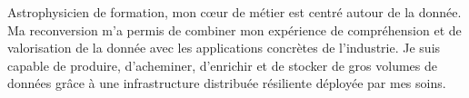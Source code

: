 

\begin{cvparagraph}

Astrophysicien de formation, mon c\oe ur de métier est centré autour de la donnée. Ma reconversion m'a permis de combiner mon expérience de compréhension et de valorisation de la donnée avec les applications concrètes de l'industrie. Je suis capable de produire, d'acheminer, d'enrichir et de stocker de gros volumes de données grâce à une infrastructure distribuée résiliente déployée par mes soins.
\end{cvparagraph}
